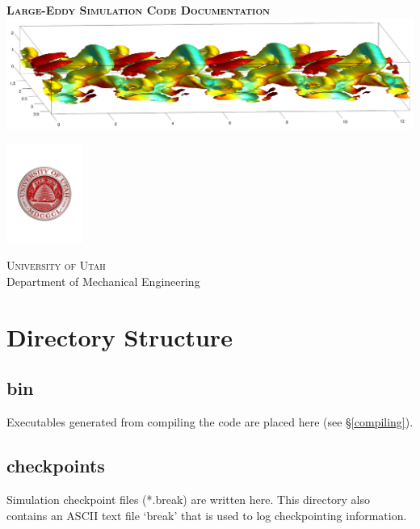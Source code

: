\documentclass[11pt]{article}
\begin{document}
\begin{titlepage}
\begin{center}

\vspace*{4cm}

\textsc{\LARGE \bf Large-Eddy Simulation Code Documentation}\\
[3cm]

\includegraphics[width=\textwidth]{graphics/structures.png}

\vspace{5.5cm}

\begin{center}
\includegraphics[width=2.5cm]{graphics/UofU_Seal.pdf}
\end{center}

\textsc{\Large University of Utah} \\
Department of Mechanical Engineering \\

\end{center}

\end{titlepage}

\tableofcontents

\newpage

\section{Directory Structure}

\subsection{bin} Executables generated from compiling the code are placed here (see \S \ref{compiling}).

\subsection{checkpoints} Simulation checkpoint files (*.break) are written here.  This directory also contains an ASCII text file `break' that is used to log checkpointing information.
\end{document}
